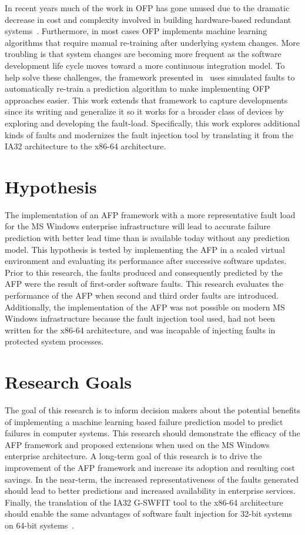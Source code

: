 In recent years much of the work in \ac{OFP} has gone unused due to the
dramatic decrease in cost and complexity involved in building hardware-based
redundant systems~\cite{irrera2015}.  Furthermore, in most cases \ac{OFP}
implements machine learning algorithms that require manual re-training after
underlying system changes.  More troubling is that system changes are becoming
more frequent as the software development life cycle moves toward a more
continuous integration model.  To help solve these challenges, the framework
presented in~\cite{irrera2015} uses simulated faults to automatically re-train
a prediction algorithm to make implementing \ac{OFP} approaches easier.  This
work extends that framework to capture developments since its writing and
generalize it so it works for a broader class of devices by exploring and
developing the fault-load.  Specifically, this work explores additional kinds
of faults and modernizes the fault injection tool by translating it from the
IA32 architecture to the x86-64 architecture.

\section{Hypothesis}
The implementation of an \ac{AFP} framework with a more representative fault
load for the \ac{MS} Windows enterprise infrastructure will lead to accurate
failure prediction with better lead time than is available today without any
prediction model.  This hypothesis is tested by implementing the \ac{AFP} in a
scaled virtual environment and evaluating its performance after successive
software updates.  Prior to this research, the faults produced and consequently
predicted by the \ac{AFP} were the result of first-order software faults.  This
research evaluates the performance of the \ac{AFP} when second and third order
faults are introduced.  Additionally, the implementation of the \ac{AFP} was
not possible on modern \ac{MS} Windows infrastructure because the fault
injection tool used, had not been written for the x86-64 architecture, and was
incapable of injecting faults in protected system processes.

\section{Research Goals} 
The goal of this research is to inform decision makers about the potential
benefits of implementing a machine learning based failure prediction model to
predict failures in computer systems.  This research should demonstrate the
efficacy of the \ac{AFP} framework and proposed extensions when used on the
\ac{MS} Windows enterprise architecture.  A long-term goal of this research
is to drive the improvement of the \ac{AFP} framework and increase its adoption
and resulting cost savings.  In the near-term, the increased representativeness
of the faults generated should lead to better predictions and increased
availability in enterprise services.  Finally, the translation of the IA32
\ac{G-SWFIT} tool to the x86-64 architecture should enable the same advantages
of software fault injection for 32-bit systems on 64-bit systems~\cite{gswfit}.

